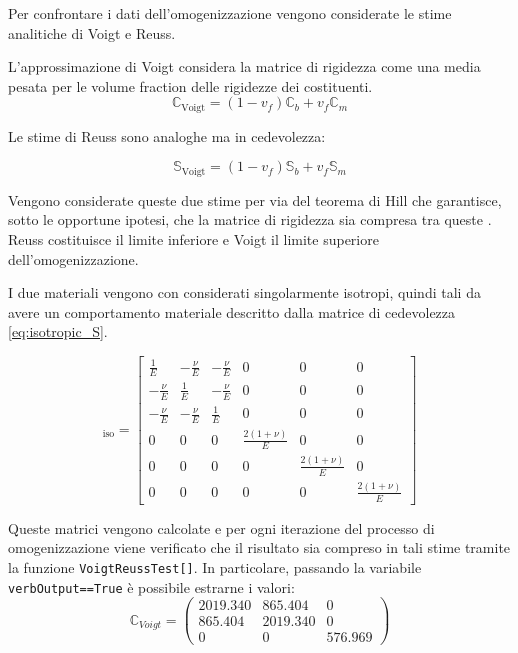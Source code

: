 \documentclass[a4paper,num-refs]{oup-contemporary}
\begin{document}
Per confrontare i dati dell'omogenizzazione vengono considerate le stime analitiche di Voigt e Reuss. 

L'approssimazione di Voigt considera la matrice di rigidezza come una media pesata per le volume fraction delle rigidezze dei costituenti. 
\begin{equation}
	\mathbb C_{\operatorname{Voigt}}=(1-v_f)\mathbb C_b+v_f \mathbb C_m
\end{equation}

Le stime di Reuss sono analoghe ma in cedevolezza:

\begin{equation}
	\mathbb S_{\operatorname{Voigt}}=(1-v_f)\mathbb S_b+v_f \mathbb S_m
\end{equation}

Vengono considerate queste due stime per via del teorema di Hill che garantisce, sotto le opportune ipotesi, che la matrice di rigidezza sia compresa tra queste \citep{ABOUDI201387}. Reuss costituisce il limite inferiore e Voigt il limite superiore dell'omogenizzazione. 

I due materiali vengono con considerati singolarmente isotropi, quindi tali da avere un comportamento materiale descritto dalla matrice di cedevolezza  \eqref{eq:isotropic_S}.

\begin{equation}
[\mathbb S]_{\operatorname{iso}}=\left[\begin{array}{cccccc}
	\frac{1}{E} & -\frac{\nu}{E} & -\frac{\nu}{E} & 0 & 0 & 0 \\
	-\frac{\nu}{E} & \frac{1}{E} & -\frac{\nu}{E} & 0 & 0 & 0 \\
	-\frac{\nu}{E} & -\frac{\nu}{E} & \frac{1}{E} & 0 & 0 & 0 \\
	0 & 0 & 0 & \frac{2(1+\nu)}{E} & 0 & 0 \\
	0 & 0 & 0 & 0 & \frac{2(1+\nu)}{E} & 0 \\
	0 & 0 & 0 & 0 & 0 & \frac{2(1+\nu)}{E}
\end{array}\right]
\label{eq:isotropic_S}
\end{equation}

Queste matrici vengono calcolate e per ogni iterazione del processo di omogenizzazione viene verificato che il risultato sia compreso in tali stime tramite la funzione \texttt{VoigtReussTest[]}. In particolare, passando la variabile \texttt{verbOutput==True} è possibile estrarne i valori:
\begin{equation}
\mathbb C_{Voigt}=\begin{pmatrix}
	2019.340&865.404&0\\
	865.404&2019.340&0\\
	0&0&576.969
	
\end{pmatrix}
\end{equation}
\end{document}

